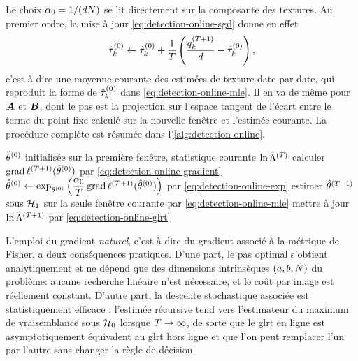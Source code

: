 Le choix $\alpha_0=1/(dN)$ se lit directement sur la composante des textures. Au premier ordre, la mise à jour \cref{eq:detection-online-sgd} donne en effet
\begin{equation*}
  \hat{\tau}_k^{(0)} \leftarrow \hat{\tau}_k^{(0)} + \frac{1}{T}\left(\frac{q_k^{(T+1)}}{d}-\hat{\tau}_k^{(0)}\right),
\end{equation*}
c'est-à-dire une moyenne courante des estimées de texture date par date, qui reproduit la forme de $\hat{\tau}_k^{(0)}$ dans \cref{eq:detection-online-mle}. Il en va de même pour $\boldsymbol{A}$ et $\boldsymbol{B}$, dont le pas est la projection sur l'espace tangent de l'écart entre le terme du point fixe calculé sur la nouvelle fenêtre et l'estimée courante. La procédure complète est résumée dans l'\cref{alg:detection-online}.

\begin{algorithm}[htbp]
\caption{Détection de changements en ligne}
\label{alg:detection-online}
\begin{algorithmic}[1]
  \Require $\hat{\theta}^{(0)}$ initialisée sur la première fenêtre, statistique courante $\ln\hat{\Lambda}^{(T)}$
    \State calculer $\operatorname{\operatorname{grad}}\ell^{(T+1)}(\hat{\theta}^{(0)})$ par \cref{eq:detection-online-gradient}
    \State $\hat{\theta}^{(0)} \gets \exp_{\hat{\theta}^{(0)}}\left(\dfrac{\alpha_0}{T}\operatorname{\operatorname{grad}}\ell^{(T+1)}(\hat{\theta}^{(0)})\right)$ par \cref{eq:detection-online-exp}
    \State estimer $\hat{\theta}^{(T+1)}$ sous $\mathcal{H}_1$ sur la seule fenêtre courante par \cref{eq:detection-online-mle}
    \State mettre à jour $\ln\hat{\Lambda}^{(T+1)}$ par \cref{eq:detection-online-glrt}
  \EndFor
\end{algorithmic}
\end{algorithm}

L'emploi du gradient \emph{naturel}, c'est-à-dire du gradient associé à la métrique de Fisher, a deux conséquences pratiques. D'une part, le pas optimal s'obtient analytiquement et ne dépend que des dimensions intrinsèques $(a,b,N)$ du problème: aucune recherche linéaire n'est nécessaire, et le coût par image est réellement constant. D'autre part, la descente stochastique associée est statistiquement efficace \cite{Zhou_2019}: l'estimée récursive tend vers l'estimateur du maximum de vraisemblance sous $\mathcal{H}_0$ lorsque $T\to\infty$, de sorte que le glrt en ligne est asymptotiquement équivalent au glrt hors ligne et que l'on peut remplacer l'un par l'autre sans changer la règle de décision.

